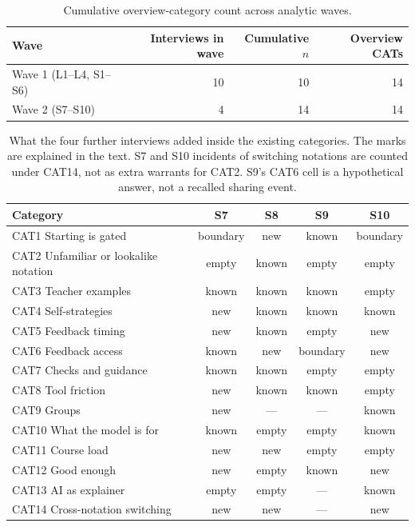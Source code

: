 \begin{table}[t]
\centering
\caption{Cumulative overview-category count across analytic waves.}
\label{tab:saturation_count}
\begin{tabular}{lrrr}
\toprule
\textbf{Wave} & \textbf{Interviews in wave} & \textbf{Cumulative $n$} & \textbf{Overview CATs} \\
\midrule
Wave 1 (L1--L4, S1--S6) & 10 & 10 & 14 \\
Wave 2 (S7--S10) & 4 & 14 & 14 \\
\bottomrule
\end{tabular}
\end{table}

\begin{table}[t]
\centering
\footnotesize
\setlength{\tabcolsep}{4pt}
\caption{What the four further interviews added inside the existing categories. The marks are explained in the text. S7 and S10 incidents of switching notations are counted under CAT14, not as extra warrants for CAT2. S9's CAT6 cell is a hypothetical answer, not a recalled sharing event.}
\label{tab:densification}
\begin{tabularx}{\textwidth}{X cccc}
\toprule
\textbf{Category} & \textbf{S7} & \textbf{S8} & \textbf{S9} & \textbf{S10} \\
\midrule
CAT1 Starting is gated & boundary & new & known & boundary \\
CAT2 Unfamiliar or lookalike notation & empty & known & empty & empty \\
CAT3 Teacher examples & known & known & known & empty \\
CAT4 Self-strategies & new & known & known & known \\
CAT5 Feedback timing & new & known & empty & new \\
CAT6 Feedback access & known & new & boundary & new \\
CAT7 Checks and guidance & known & known & empty & empty \\
CAT8 Tool friction & new & known & known & empty \\
CAT9 Groups & new & --- & --- & known \\
CAT10 What the model is for & known & empty & empty & known \\
CAT11 Course load & new & new & empty & empty \\
CAT12 Good enough & new & empty & known & new \\
CAT13 AI as explainer & empty & empty & --- & known \\
CAT14 Cross-notation switching & new & new & --- & new \\
\bottomrule
\end{tabularx}
\end{table}

